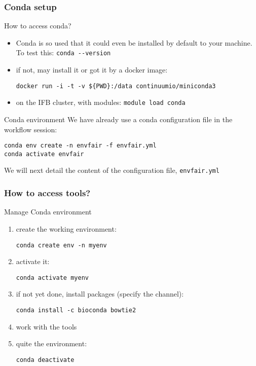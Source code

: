 \begin{frame}[containsverbatim]
\frametitle{Conda setup}
\begin{exampleblock}{How to access conda?}
\begin{itemize}
    \item Conda is so used that it could even be installed by default to your machine. To test this: \verb|conda --version|
    \item if not, may install it or got it by a docker image:
\begin{lstlisting}
docker run -i -t -v ${PWD}:/data continuumio/miniconda3
\end{lstlisting}
    \item on the IFB cluster, with modules: \verb|module load conda|
\end{itemize} 
\end{exampleblock}
\begin{exampleblock}{Conda environment}
We have already use a conda configuration file in the workflow session:
\begin{lstlisting}
conda env create -n envfair -f envfair.yml
conda activate envfair
\end{lstlisting}
We will next detail the content of the configuration file, \verb|envfair.yml|
\end{exampleblock}
\end{frame}
\begin{frame}[containsverbatim]
\frametitle{How to access tools?}
\begin{exampleblock}{Manage Conda environment}
\begin{enumerate}
    \item create the working environment:
\begin{lstlisting}
conda create env -n myenv
\end{lstlisting}
    \item activate it: 
\begin{lstlisting}
conda activate myenv
\end{lstlisting}
    \item if not yet done, install packages (specify the channel): 
\begin{lstlisting}
conda install -c bioconda bowtie2
\end{lstlisting}
    \item work with the tools
    \item quite the environment: 
\begin{lstlisting}
conda deactivate
\end{lstlisting}
\end{enumerate}
\end{exampleblock}
\end{frame}
